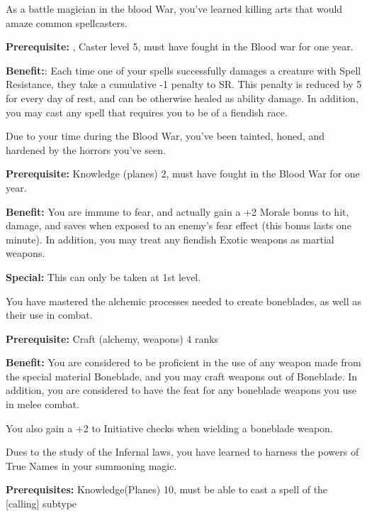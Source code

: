 
As a battle magician in the blood War, you've learned killing arts that would amaze common spellcasters.

\textbf{Prerequisite:} , Caster level 5, must have fought in the Blood war for one year.

\textbf{Benefit:}: Each time one of your spells successfully damages a creature with Spell Resistance, they take a cumulative -1 penalty to SR. This penalty is reduced by 5 for every day of rest, and can be otherwise healed as ability damage. In addition, you may cast any spell that requires you to be of a fiendish race.


Due to your time during the Blood War, you've been tainted, honed, and hardened by the horrors you've seen.

\textbf{Prerequisite:} Knowledge (planes) 2, must have fought in the Blood War for one year.

\textbf{Benefit:} You are immune to fear, and actually gain a +2 Morale bonus to hit, damage, and saves when exposed to an enemy's fear effect (this bonus lasts one minute). In addition, you may treat any fiendish Exotic weapons as martial weapons.

\textbf{Special:} This can only be taken at 1st level.


You have mastered the alchemic processes needed to create boneblades, as well as their use in combat.

\textbf{Prerequisite:} Craft (alchemy, weapons) 4 ranks

\textbf{Benefit:} You are considered to be proficient in the use of any weapon made from the special material Boneblade, and you may craft weapons out of Boneblade. In addition, you are considered to have the  feat for any boneblade weapons you use in melee combat.

You also gain a +2 to Initiative checks when wielding a boneblade weapon.


Dues to the study of the Infernal laws, you have learned to harness the powers of True Names in your summoning magic.

\textbf{Prerequisites:} Knowledge(Planes) 10, must be able to cast a spell of the [calling] subtype

